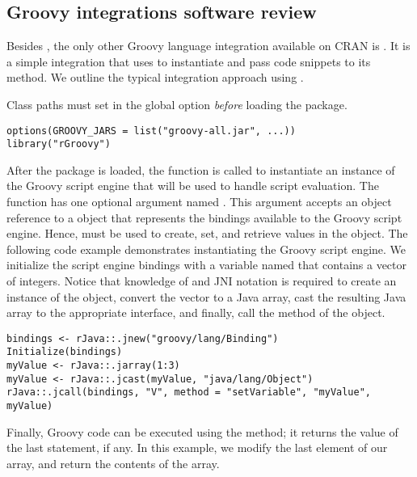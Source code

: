 \hypertarget{groovy-integrations}{}
\subsection{Groovy integrations software review}

Besides , the only other Groovy language integration available on CRAN is  \citep{rgroovy}. It is a simple integration that uses  to instantiate  and pass code snippets to its  method. We outline the typical integration approach using .

Class paths must set in the global option  \textit{before} loading the  package.

\begin{verbatim}
options(GROOVY_JARS = list("groovy-all.jar", ...))
library("rGroovy")
\end{verbatim}

After the package is loaded, the  function is called to instantiate an instance of the Groovy script engine that will be used to handle script evaluation. The  function has one optional argument named . This argument accepts an  object reference to a  object that represents the bindings available to the Groovy script engine. Hence,  must be used to create, set, and retrieve values in the  object. The following code example demonstrates instantiating the Groovy script engine. We initialize the script engine bindings with a variable named  that contains a vector of integers. Notice that knowledge of  and JNI notation is required to create an instance of the  object, convert the vector to a Java array, cast the resulting Java array to the appropriate interface, and finally, call the  method of the  object.

\begin{verbatim}
bindings <- rJava::.jnew("groovy/lang/Binding")
Initialize(bindings)
myValue <- rJava::.jarray(1:3)
myValue <- rJava::.jcast(myValue, "java/lang/Object")
rJava::.jcall(bindings, "V", method = "setVariable", "myValue", myValue)
\end{verbatim}

Finally, Groovy code can be executed using the  method; it returns the value of the last statement, if any. In this example, we modify the last element of our  array, and return the contents of the array.

